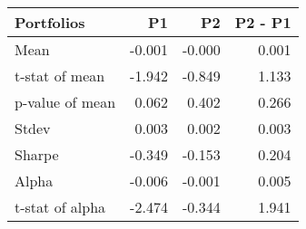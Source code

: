 \begin{tabular}{lrrr}
\toprule
Portfolios & P1 & P2 & P2 - P1 \\
\midrule
Mean & -0.001 & -0.000 & 0.001 \\
t-stat of mean & -1.942 & -0.849 & 1.133 \\
p-value of mean & 0.062 & 0.402 & 0.266 \\
Stdev & 0.003 & 0.002 & 0.003 \\
Sharpe & -0.349 & -0.153 & 0.204 \\
Alpha & -0.006 & -0.001 & 0.005 \\
t-stat of alpha & -2.474 & -0.344 & 1.941 \\
\bottomrule
\end{tabular}
